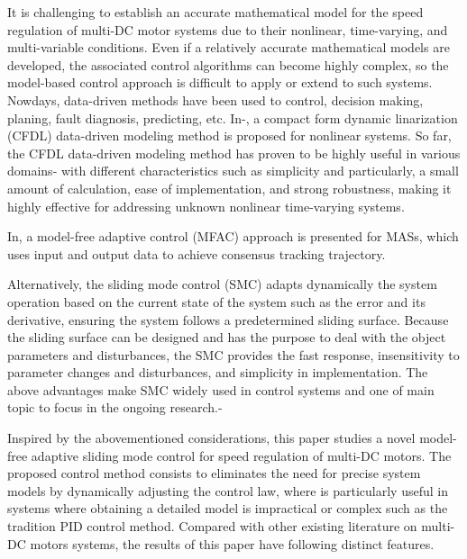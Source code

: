 \documentclass[journal,onecolumn]{IEEEtran}
\begin{document}
It is challenging to establish an accurate mathematical model for the speed regulation of multi-DC motor systems due to their nonlinear, time-varying, and multi-variable conditions\cite{7}. Even if a relatively accurate mathematical models are developed, the associated control algorithms can become highly complex, so the model-based control approach is difficult to apply or extend to such systems. Nowdays, data-driven methods have been used to control, decision making, planing, fault diagnosis, predicting, etc. In\cite{15}-\cite{16}, a compact form dynamic linarization (CFDL) data-driven modeling method is proposed for nonlinear systems. So far, the CFDL data-driven modeling method has proven to be highly useful in various domains\cite{17}-\cite{20} with different characteristics such as simplicity and particularly, a small amount of calculation, ease of implementation, and strong robustness, making it highly effective for addressing unknown nonlinear time-varying systems.

In\cite{21}, a model-free adaptive control (MFAC) approach is presented for MASs, which uses input and output data to achieve consensus tracking trajectory.

Alternatively, the sliding mode control (SMC) adapts dynamically the system operation based on the current state of the system such as the error and its derivative, ensuring the system follows a predetermined sliding surface\cite{22}. Because the sliding surface can be designed and has the purpose to deal with the object parameters and disturbances, the SMC provides the fast response, insensitivity to parameter changes and disturbances, and simplicity in implementation. The above advantages make SMC widely used in control systems and one of main topic to focus in the ongoing research.\cite{28}-\cite{30}

Inspired by the abovementioned considerations, this paper studies a novel model-free adaptive sliding mode control for speed regulation of multi-DC motors. The proposed control method consists to eliminates the need for precise system models by dynamically adjusting the control law\cite{21}, where is particularly useful in systems where obtaining a detailed model is impractical or complex such as the tradition PID control method. Compared with other existing literature on multi-DC motors systems, the results of this paper have following distinct features.
\end{document}
